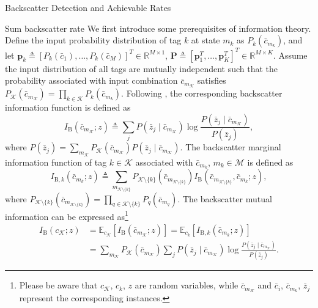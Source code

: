 \documentclass[journal]{IEEEtran}
\begin{document}
\begin{section}{Backscatter Detection and Achievable Rates}
		\begin{subsection}{Sum backscatter rate}
			We first introduce some prerequisites of information theory. Define the input probability distribution of tag $k$ at state $m_k$ as $P_k(\bar{c}_{m_k})$, and let $\boldsymbol{p}_k \triangleq [P_k(\bar{c}_1),\ldots,P_k(\bar{c}_M)]^T \in \mathbb{R}^{M \times 1}$, $\boldsymbol{P} \triangleq [\boldsymbol{p}_1^T,\ldots,\boldsymbol{p}_K^T]^T \in \mathbb{R}^{M \times K}$. Assume the input distribution of all tags are mutually independent such that the probability associated with input combination $\bar{c}_{m_{\mathcal{K}}}$ satisfies $P_{\mathcal{K}}(\bar{c}_{m_{\mathcal{K}}}) = \prod_{k \in \mathcal{K}} P_k(\bar{c}_{m_k})$. Following \cite{Rezaeian2004}, the corresponding backscatter information function is defined as
			\begin{equation}
				I_{\mathrm{B}}(\bar{c}_{m_{\mathcal{K}}};z) \triangleq \sum_j P(\bar{z}_j \mid \bar{c}_{m_{\mathcal{K}}}) \log \frac{P(\bar{z}_j \mid \bar{c}_{m_{\mathcal{K}}})}{P(\bar{z}_j)},
				\label{eq:backscatter_information_function}
			\end{equation}
			where $P(\bar{z}_j) = \sum_{m_{\mathcal{K}}} P_{\mathcal{K}}(\bar{c}_{m_{\mathcal{K}}}) P(\bar{z}_j \mid \bar{c}_{m_{\mathcal{K}}})$.
			The backscatter marginal information function of tag $k \in \mathcal{K}$ associated with $\bar{c}_{m_k}$, $m_k \in \mathcal{M}$ is defined as
			\begin{equation}
				I_{\mathrm{B},k}(\bar{c}_{m_k};z) \triangleq \sum_{m_{\mathcal{K} \setminus \{k\}}} P_{\mathcal{K} \setminus \{k\}}(\bar{c}_{m_{\mathcal{K} \setminus \{k\}}}) I_{\mathrm{B}}(\bar{c}_{m_{\mathcal{K} \setminus \{k\}}},\bar{c}_{m_k};z),
				\label{eq:backscatter_marginal_information_function}
			\end{equation}
			where $P_{\mathcal{K} \setminus \{k\}}(\bar{c}_{m_{\mathcal{K} \setminus \{k\}}}) = \prod_{q \in \mathcal{K} \setminus \{k\}} P_{q}(\bar{c}_{m_{q}})$. The backscatter mutual information can be expressed as\footnote{Please be aware that $c_{\mathcal{K}}$, $c_k$, $z$ are random variables, while $\bar{c}_{m_{\mathcal{K}}}$ and $\bar{c}_i$, $\bar{c}_{m_k}$, $\bar{z}_j$ represent the corresponding instances.}
			\begin{subequations}
				\begin{align}
					I_{\mathrm{B}}(c_{\mathcal{K}};z)
					& = \mathbb{E}_{c_{\mathcal{K}}} \left[I_{\mathrm{B}}(\bar{c}_{m_{\mathcal{K}}};z)\right] = \mathbb{E}_{c_k} \left[I_{\mathrm{B},k}(\bar{c}_{m_k};z)\right]\label{eq:backscatter_sum_rate_expectation}\\
					& = \sum_{m_{\mathcal{K}}} P_{\mathcal{K}}(\bar{c}_{m_{\mathcal{K}}}) \sum_j P(\bar{z}_j \mid \bar{c}_{m_{\mathcal{K}}}) \log \frac{P(\bar{z}_j \mid \bar{c}_{m_{\mathcal{K}}})}{P(\bar{z}_j)}.\label{eq:backscatter_sum_rate_expansion}
				\end{align}
				\label{eq:backscatter_sum_rate}
			\end{subequations}


\end{subsection}
\end{section}
\end{document}
